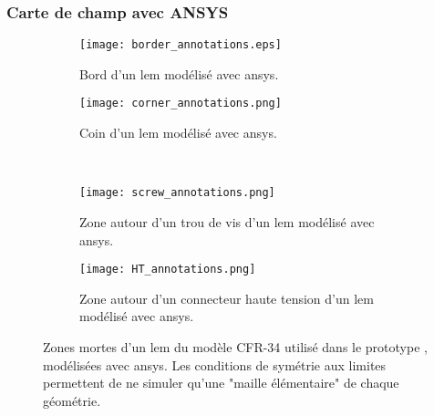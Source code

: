       \subsubsection{Carte de champ avec ANSYS}
                
        \begin{figure}[!htb]
          \begin{subfigure}[t]{0.61\textwidth}
            \centering
            \texttt{[image: border\_annotations.eps]}
            \caption{\label{fig::lem_border}Bord d'un \gls{lem} modélisé avec \gls{ansys}.}
          \end{subfigure}
          \hfill
          \begin{subfigure}[t]{0.31\textwidth}
            \centering
            \texttt{[image: corner\_annotations.png]}
            \caption{\label{fig::corner}Coin d'un \gls{lem} modélisé avec \gls{ansys}.}
          \end{subfigure}\\
          \begin{subfigure}[b]{0.42\textwidth}
            \centering
            \texttt{[image: screw\_annotations.png]}
            \caption{\label{fig::screw}Zone autour d'un trou de vis d'un \gls{lem} modélisé avec \gls{ansys}.}
          \end{subfigure}
          \hfill
          \begin{subfigure}[b]{0.48\textwidth}
            \centering
            \texttt{[image: HT\_annotations.png]}
            \caption{\label{fig::HT}Zone autour d'un connecteur haute tension d'un \gls{lem} modélisé avec \gls{ansys}.}
          \end{subfigure}
          \caption[Zones mortes d'un LEM modélisé avec ANSYS]{Zones mortes d'un \gls{lem} du modèle CFR-34 utilisé dans le prototype \TOO{}, modélisées avec \gls{ansys}. Les conditions de symétrie aux limites permettent de ne simuler qu'une "maille élémentaire" de chaque géométrie.}
          \label{fig::dead_zones}
        \end{figure}
            
